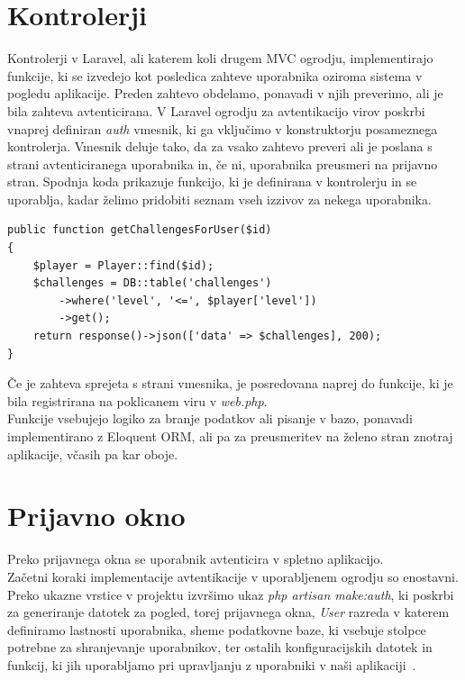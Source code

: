 \documentclass[a4paper, 12pt]{book}
\begin{document}
\section{Kontrolerji}
Kontrolerji v Laravel, ali katerem koli drugem MVC ogrodju, implementirajo funkcije, ki se izvedejo kot posledica zahteve uporabnika oziroma sistema v pogledu aplikacije. Preden zahtevo obdelamo, ponavadi v njih preverimo, ali je bila zahteva avtenticirana. V Laravel ogrodju za avtentikacijo virov poskrbi vnaprej definiran \textit{auth} vmesnik, ki ga vključimo v konstruktorju posameznega kontrolerja. Vmesnik deluje tako, da za vsako zahtevo preveri ali je poslana s strani avtenticiranega uporabnika in, če ni, uporabnika preusmeri na prijavno stran. Spodnja koda prikazuje funkcijo, ki je definirana v kontrolerju in se uporablja, kadar želimo pridobiti seznam vseh izzivov za nekega uporabnika.
\begin{lstlisting}
public function getChallengesForUser($id)
{
    $player = Player::find($id);
    $challenges = DB::table('challenges')
        ->where('level', '<=', $player['level'])
        ->get();
    return response()->json(['data' => $challenges], 200);
}
\end{lstlisting}
Če je zahteva sprejeta s strani vmesnika, je posredovana naprej do funkcije, ki je bila registrirana na poklicanem viru v \textit{web.php}.\\Funkcije vsebujejo logiko za branje podatkov ali pisanje v bazo, ponavadi implementirano z Eloquent ORM, ali pa za preusmeritev na želeno stran znotraj aplikacije, včasih pa kar oboje.
\section{Prijavno okno}
Preko prijavnega okna se uporabnik avtenticira v spletno aplikacijo.\\Začetni koraki implementacije avtentikacije v uporabljenem ogrodju so enostavni. Preko ukazne vrstice v projektu izvršimo ukaz \textit{php artisan make:auth}, ki poskrbi za generiranje datotek za pogled, torej prijavnega okna, \textit{User} razreda v katerem definiramo lastnosti uporabnika, sheme podatkovne baze, ki vsebuje stolpce potrebne za shranjevanje uporabnikov, ter ostalih konfiguracijskih datotek in funkcij, ki jih uporabljamo pri upravljanju z uporabniki v naši aplikaciji~\cite{laraauth}.
\end{document}
